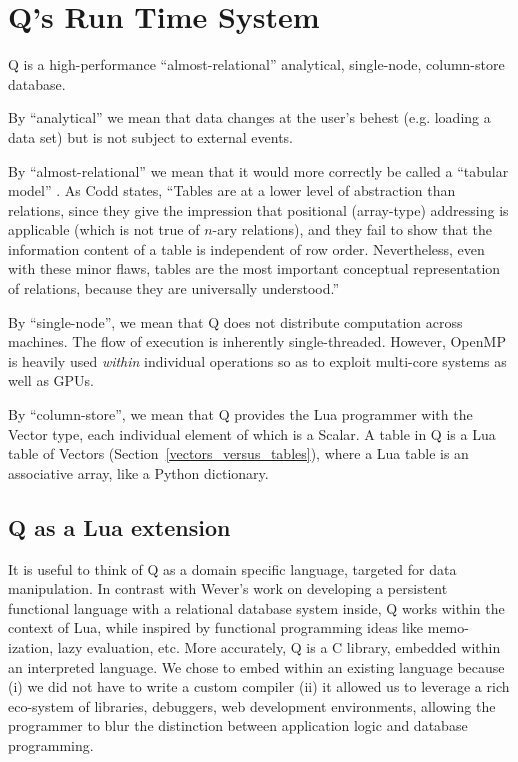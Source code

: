 \section{Q's Run Time System}

Q is a high-performance ``almost-relational'' 
analytical, single-node, column-store database. 
\be
\item 
By ``analytical'' we mean that data changes at the user's behest (e.g.
loading a data set) but is not subject to external events.
\item 
By ``almost-relational'' we mean that it would more correctly
be called a ``tabular model'' \cite{Codd1982}. As Codd states, ``Tables are
at a lower level of abstraction than relations, since they give
the impression that positional (array-type) addressing is applicable
(which is not true of \(n\)-ary relations), and they fail to
show that the information content of a table is independent
of row order. Nevertheless, even with these minor flaws,
tables are the most important conceptual representation of
relations, because they are universally understood.''
\item By ``single-node'', we mean that Q does not distribute computation across
  machines. The flow of execution is inherently single-threaded. However,
  OpenMP is heavily used {\em within} individual operations so as
  to exploit multi-core systems as well as GPUs.
\item By ``column-store'', we mean that 
Q provides the Lua programmer with the Vector type, each
individual element of which is a Scalar. A table in Q is a Lua
table of Vectors (Section~\ref{vectors_versus_tables}), where a Lua table is an
associative array, like a Python dictionary.

\ee

\subsection{Q as a Lua extension}


It is useful to think of Q as a domain specific language, targeted for data
manipulation. In contrast with Wever's work \cite{Wevers2014} on
developing a persistent functional language with
a relational database system inside, Q works within the context of Lua, while
inspired by functional programming ideas like memo-ization, lazy evaluation,
etc.
More accurately, Q is a C library, embedded within an interpreted
language.
We chose to embed within an existing language because (i) we did not have to
write a custom compiler (ii) it allowed us to leverage a rich eco-system of
libraries, debuggers, web development environments, allowing the programmer to
blur the distinction between application logic and database programming.

